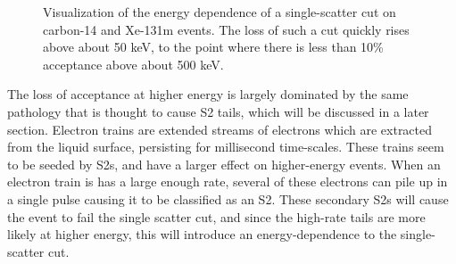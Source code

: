 \begin{figure}[h!]
\begin{subfigure}{0.5\textwidth}
\end{subfigure}
\caption{Visualization of the energy dependence of a single-scatter cut on carbon-14 and Xe-131m events. The loss of such a cut quickly rises above about 50 keV, to the point  where there is less than 10\% acceptance above about 500 keV.}
\label{fig:ssplot}
\end{figure}

The loss of acceptance at higher energy is largely dominated by the same pathology that is thought to cause S2 tails, which will be discussed in a later section. Electron trains are extended streams of electrons which are extracted from the liquid surface, persisting for millisecond time-scales. These trains seem to be seeded by S2s, and have a larger effect on higher-energy events. When an electron train is has a large enough rate, several of these electrons can pile up in a single pulse causing it to be classified as an S2. These secondary S2s will cause the event to fail the single scatter cut, and since the high-rate tails are more likely at higher energy, this will introduce an energy-dependence to the single-scatter cut.


